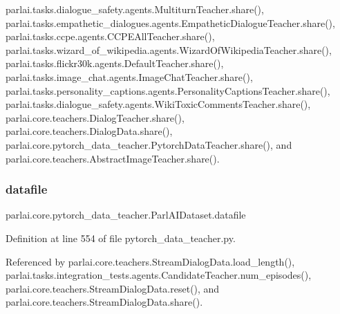 parlai.\+tasks.\+dialogue\+\_\+safety.\+agents.\+Multiturn\+Teacher.\+share(), parlai.\+tasks.\+empathetic\+\_\+dialogues.\+agents.\+Empathetic\+Dialogue\+Teacher.\+share(), parlai.\+tasks.\+ccpe.\+agents.\+C\+C\+P\+E\+All\+Teacher.\+share(), parlai.\+tasks.\+wizard\+\_\+of\+\_\+wikipedia.\+agents.\+Wizard\+Of\+Wikipedia\+Teacher.\+share(), parlai.\+tasks.\+flickr30k.\+agents.\+Default\+Teacher.\+share(), parlai.\+tasks.\+image\+\_\+chat.\+agents.\+Image\+Chat\+Teacher.\+share(), parlai.\+tasks.\+personality\+\_\+captions.\+agents.\+Personality\+Captions\+Teacher.\+share(), parlai.\+tasks.\+dialogue\+\_\+safety.\+agents.\+Wiki\+Toxic\+Comments\+Teacher.\+share(), parlai.\+core.\+teachers.\+Dialog\+Teacher.\+share(), parlai.\+core.\+teachers.\+Dialog\+Data.\+share(), parlai.\+core.\+pytorch\+\_\+data\+\_\+teacher.\+Pytorch\+Data\+Teacher.\+share(), and parlai.\+core.\+teachers.\+Abstract\+Image\+Teacher.\+share().

\mbox{\label{classparlai_1_1core_1_1pytorch__data__teacher_1_1ParlAIDataset_acca9d3d351fc78077bfa4fe9acd49212}} 
\subsubsection{\texorpdfstring{datafile}{datafile}}
{\footnotesize\ttfamily parlai.\+core.\+pytorch\+\_\+data\+\_\+teacher.\+Parl\+A\+I\+Dataset.\+datafile}



Definition at line 554 of file pytorch\+\_\+data\+\_\+teacher.\+py.



Referenced by parlai.\+core.\+teachers.\+Stream\+Dialog\+Data.\+load\+\_\+length(), parlai.\+tasks.\+integration\+\_\+tests.\+agents.\+Candidate\+Teacher.\+num\+\_\+episodes(), parlai.\+core.\+teachers.\+Stream\+Dialog\+Data.\+reset(), and parlai.\+core.\+teachers.\+Stream\+Dialog\+Data.\+share().

\mbox{\label{classparlai_1_1core_1_1pytorch__data__teacher_1_1ParlAIDataset_a64e2f65a3ef4b138f1de4780839d545a}} 
